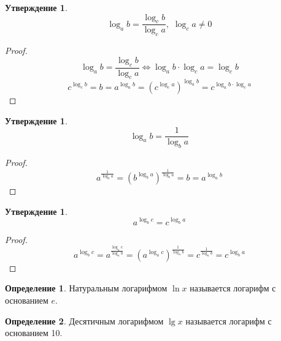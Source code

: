 \documentclass[12pt]{article}
\theoremstyle{definition}
\newtheorem{definition}{Определение}
\newtheorem{statement}[theorem]{Утверждение}
\begin{document}
    \begin{statement}
        $$\log_ab=\frac{\log_cb}{\log_ca},\,\,\log_ca\neq0$$
    \end{statement}
    \begin{proof}
        $$\log_ab=\frac{\log_cb}{\log_ca}\Longleftrightarrow\log_ab\cdot\log_ca=\log_cb$$
        $$c^{\log_cb}=b=a^{\log_ab}=\left(c^{\log_ca}\right)^{\log_ab}=c^{\log_ab\cdot\log_ca}$$
    \end{proof}
    \begin{statement}
        $$\log_ab=\frac{1}{\log_ba}$$
    \end{statement}
    \begin{proof}
        $$a^{\frac{1}{\log_ba}}=\left(b^{\log_ba}\right)^{\frac{1}{\log_ba}}=b=a^{\log_ab}$$
    \end{proof}
    \begin{statement}
        $$a^{\log_bc}=c^{\log_ba}$$
    \end{statement}
    \begin{proof}
        $$a^{\log_bc}=a^{\frac{\log_ac}{\log_ab}}=\left(a^{\log_ac}\right)^{\frac{1}{\log_ab}}=c^\frac{1}{\log_ab}=c^{\log_ba}$$
    \end{proof}
    \begin{definition}
        Натуральным логарифмом $\ln x$ называется логарифм с основанием $e$.
    \end{definition}
    \begin{definition}
        Десятичным логарифмом $\lg x$ называется логарифм с основанием 10.
    \end{definition}
\end{document}
